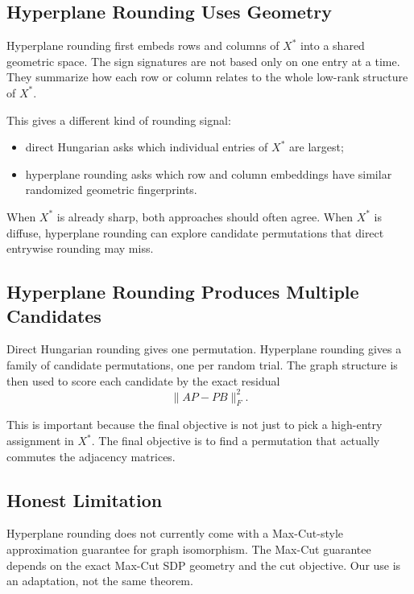 \documentclass[11pt]{article}
\begin{document}
\subsection{Hyperplane Rounding Uses Geometry}

Hyperplane rounding first embeds rows and columns of $X^*$ into a shared
geometric space.
The sign signatures are not based only on one entry at a time.
They summarize how each row or column relates to the whole low-rank structure
of $X^*$.

This gives a different kind of rounding signal:
\begin{itemize}[leftmargin=*]
    \item direct Hungarian asks which individual entries of $X^*$ are largest;
    \item hyperplane rounding asks which row and column embeddings have similar
    randomized geometric fingerprints.
\end{itemize}

When $X^*$ is already sharp, both approaches should often agree.
When $X^*$ is diffuse, hyperplane rounding can explore candidate permutations
that direct entrywise rounding may miss.

\subsection{Hyperplane Rounding Produces Multiple Candidates}

Direct Hungarian rounding gives one permutation.
Hyperplane rounding gives a family of candidate permutations, one per random
trial.
The graph structure is then used to score each candidate by the exact residual
\begin{equation}
    \|AP-PB\|_F^2.
\end{equation}

This is important because the final objective is not just to pick a high-entry
assignment in $X^*$.
The final objective is to find a permutation that actually commutes the
adjacency matrices.

\subsection{Honest Limitation}

Hyperplane rounding does not currently come with a Max-Cut-style approximation
guarantee for graph isomorphism.
The Max-Cut guarantee depends on the exact Max-Cut SDP geometry and the cut
objective.
Our use is an adaptation, not the same theorem.
\end{document}
